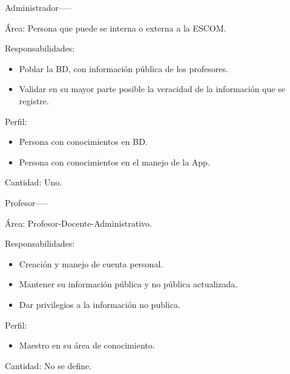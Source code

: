     \begin{actor}{Administrador}{-----}

	\item[Área:] Persona que puede se interna o externa a la ESCOM.

	\item[Responsabilidades:] \hspace{1pt}
	
		\begin{itemize}
		    \item Poblar la BD, con información pública de los profesores.
		    \item Validar en su mayor parte posible la veracidad de la información que se registre.
		 \end{itemize}
	\item[Perfil:] \hspace{1pt}
		\begin{itemize}
		    \item Persona con conocimientos en BD.
		    \item Persona con conocimientos en el manejo de la App.
	    \end{itemize}
	\item[Cantidad:] Uno.
\end{actor}


\begin{actor}{Profesor}{-----}
	
	\item[Área:] Profesor-Docente-Administrativo.
	
	\item[Responsabilidades:] \hspace{1pt}
	    \begin{itemize}
	    	\item Creación y manejo de cuenta personal.
	    	\item Mantener su información pública y no pública actualizada.
	    	\item Dar privilegios a la información no publica.
	    \end{itemize}
	\item[Perfil:] \hspace{1pt}
	\begin{itemize}
		\item Maestro en su área de conocimiento.
	\end{itemize}
	\item[Cantidad:] No se define.
\end{actor}


